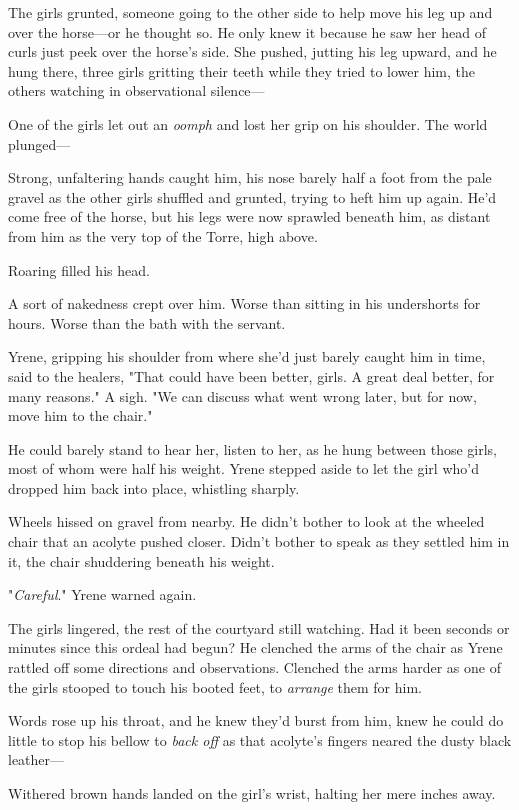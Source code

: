The girls grunted, someone going to the other side to help move his leg up and over the horse---or he thought so. He only knew it because he saw her head of curls just peek over the horse's side. She pushed, jutting his leg upward, and he hung there, three girls gritting their teeth while they tried to lower him, the others watching in observational silence---

One of the girls let out an \emph{oomph} and lost her grip on his shoulder. The world plunged---

Strong, unfaltering hands caught him, his nose barely half a foot from the pale gravel as the other girls shuffled and grunted, trying to heft him up again. He'd come free of the horse, but his legs were now sprawled beneath him, as distant from him as the very top of the Torre, high above.

Roaring filled his head.

A sort of nakedness crept over him. Worse than sitting in his undershorts for hours. Worse than the bath with the servant.

Yrene, gripping his shoulder from where she'd just barely caught him in time, said to the healers, "That could have been better, girls. A great deal better, for many reasons." A sigh. "We can discuss what went wrong later, but for now, move him to the chair."

He could barely stand to hear her, listen to her, as he hung between those girls, most of whom were half his weight. Yrene stepped aside to let the girl who'd dropped him back into place, whistling sharply.

Wheels hissed on gravel from nearby. He didn't bother to look at the wheeled chair that an acolyte pushed closer. Didn't bother to speak as they settled him in it, the chair shuddering beneath his weight.

"\emph{Careful}." Yrene warned again.

The girls lingered, the rest of the courtyard still watching. Had it been seconds or minutes since this ordeal had begun? He clenched the arms of the chair as Yrene rattled off some directions and observations. Clenched the arms harder as one of the girls stooped to touch his booted feet, to \emph{arrange} them for him.

Words rose up his throat, and he knew they'd burst from him, knew he could do little to stop his bellow to \emph{back off} as that acolyte's fingers neared the dusty black leather---

Withered brown hands landed on the girl's wrist, halting her mere inches away.


